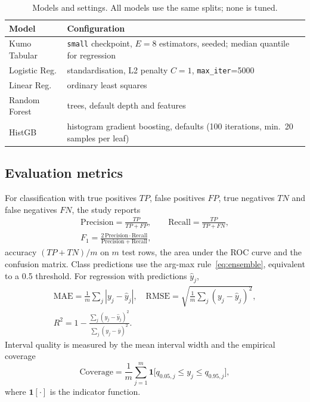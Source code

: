 \documentclass{ieeeaccess}
\begin{document}
\begin{table}[t]
\centering
\caption{Models and settings. All models use the same splits; none is tuned.}
\label{tab:models}
\setlength{\tabcolsep}{3pt}
\begin{tabular}{>{\raggedright\arraybackslash}p{}>{\raggedright\arraybackslash}p{}}
\toprule
Model & Configuration \\
\midrule
Kumo Tabular & \texttt{small} checkpoint, $E=8$ estimators, seeded; median quantile for regression \\
Logistic Reg. & standardisation, L2 penalty $C=1$, \texttt{max\_iter}=5000 \\
Linear Reg. & ordinary least squares \\
Random Forest & 500 trees, default depth and features \\
HistGB & histogram gradient boosting, defaults (100 iterations, min.\ 20 samples per leaf) \\
\bottomrule
\end{tabular}
\end{table}

\subsection{Evaluation metrics}
For classification with true positives $TP$, false positives $FP$, true negatives $TN$ and false negatives $FN$, the study reports
\begin{gather}
\mathrm{Precision}=\tfrac{TP}{TP+FP},\qquad \mathrm{Recall}=\tfrac{TP}{TP+FN},\\
F_1=\tfrac{2\,\mathrm{Precision}\cdot\mathrm{Recall}}{\mathrm{Precision}+\mathrm{Recall}},
\end{gather}
accuracy $(TP+TN)/m$ on $m$ test rows, the area under the ROC curve \cite{fawcett2006roc} and the confusion matrix. Class predictions use the arg-max rule~\eqref{eq:ensemble}, equivalent to a 0.5 threshold. For regression with predictions $\hat{y}_j$,
\begin{gather}
\mathrm{MAE}=\tfrac{1}{m}\textstyle\sum_j|y_j-\hat{y}_j|,\quad
\mathrm{RMSE}=\sqrt{\tfrac{1}{m}\textstyle\sum_j(y_j-\hat{y}_j)^2},\\
R^2=1-\frac{\sum_j(y_j-\hat{y}_j)^2}{\sum_j(y_j-\bar{y})^2}.
\end{gather}
Interval quality is measured by the mean interval width and the empirical coverage
\begin{equation}
\mathrm{Coverage}=\frac{1}{m}\sum_{j=1}^{m}\mathbf{1}\big[q_{0.05,j}\le y_j\le q_{0.95,j}\big],
\end{equation}
where $\mathbf{1}[\cdot]$ is the indicator function.
\end{document}
